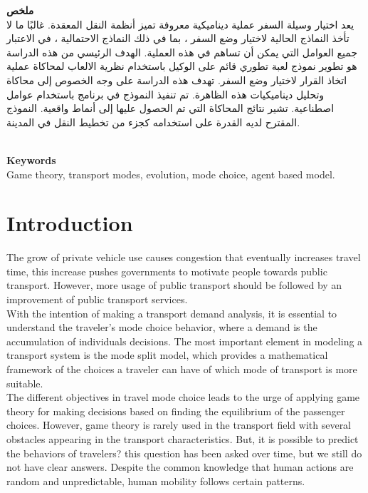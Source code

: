 \documentclass[12pt]{report}
\begin{document}
\begin{center}
   \begin{otherlanguage}{arabic}
   \textbf{ملخص}\\
 \vspace{0.2cm}
يعد اختيار وسيلة السفر عملية ديناميكية معروفة تميز أنظمة النقل المعقدة. غالبًا ما لا تأخذ النماذج الحالية لاختيار وضع السفر ، بما في ذلك النماذج الاحتمالية ، في الاعتبار جميع العوامل التي يمكن أن تساهم في هذه العملية. الهدف الرئيسي من هذه الدراسة هو تطوير نموذج لعبة تطوري قائم على الوكيل باستخدام نظرية الالعاب لمحاكاة عملية اتخاذ القرار لاختيار وضع السفر. تهدف هذه الدراسة على وجه الخصوص إلى محاكاة وتحليل ديناميكيات هذه الظاهرة. تم تنفيذ النموذج في برنامج   باستخدام عوامل اصطناعية. تشير نتائج المحاكاة التي تم الحصول عليها إلى أنماط واقعية. النموذج المقترح لديه القدرة على استخدامه كجزء من تخطيط النقل في المدينة. 
\end{otherlanguage}
\\
\vspace{0.2cm}
\textbf{Keywords}\\
\vspace{0.2cm}
Game theory, transport modes, evolution, mode choice, agent based model.

\end{center}

\tableofcontents
\listoffigures
\listoftables


\clearpage


\chapter*{Introduction}
\setcounter{page}{1}
The grow of private vehicle use causes congestion that eventually  increases travel time, this increase pushes governments to motivate people towards public transport. However, more usage of public transport should be followed by an improvement of public transport services.\\

With the intention of making a transport demand analysis, it is essential to understand the traveler's mode choice behavior, where a demand is the accumulation of individuals decisions. The most important element in modeling a transport system is the mode split model, which provides a mathematical framework of the choices a traveler can have of which mode of transport is more suitable.\\

The different objectives in travel mode choice leads to the urge of applying game theory for making decisions based on finding the equilibrium of the passenger choices. However, game theory is rarely used in the transport field with several obstacles appearing in the transport characteristics. But, it is possible to predict the behaviors of travelers? this question has been asked over time, but we still do not have clear answers. Despite the common knowledge that human actions are random and unpredictable, human mobility follows certain patterns.\\
\end{document}
